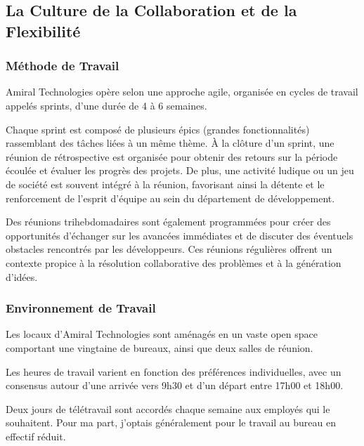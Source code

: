 \subsection{La Culture de la Collaboration et de la Flexibilité}
\subsubsection{Méthode de Travail}
Amiral Technologies opère selon une approche agile, organisée en cycles de travail appelés sprints, d'une durée de 4 à 6 semaines.

Chaque sprint est composé de plusieurs épics (grandes fonctionnalités) rassemblant des tâches liées à un même thème.
À la clôture d'un sprint, une réunion de rétrospective est organisée pour obtenir des retours sur la période écoulée et évaluer les progrès des projets.
De plus, une activité ludique ou un jeu de société est souvent intégré à la réunion, favorisant ainsi la détente et le renforcement de l'esprit d'équipe au sein du département de développement.

Des réunions trihebdomadaires sont également programmées pour créer des opportunités d'échanger sur les avancées immédiates et de discuter des éventuels obstacles rencontrés par les développeurs.
Ces réunions régulières offrent un contexte propice à la résolution collaborative des problèmes et à la génération d'idées.

\subsubsection{Environnement de Travail}
Les locaux d'Amiral Technologies sont aménagés en un vaste open space comportant une vingtaine de bureaux, ainsi que deux salles de réunion.

Les heures de travail varient en fonction des préférences individuelles, avec un consensus autour d'une arrivée vers 9h30 et d'un départ entre 17h00 et 18h00.

Deux jours de télétravail sont accordés chaque semaine aux employés qui le souhaitent.
Pour ma part, j'optais généralement pour le travail au bureau en effectif réduit.

